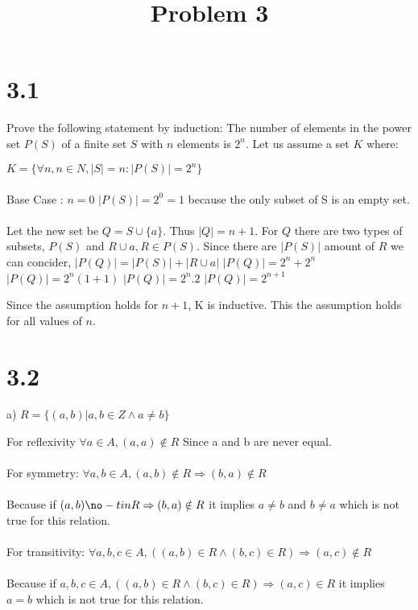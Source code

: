 \documentclass{article}
\begin{document}
    \title{\textbf{Problem 3}}
    \maketitle
    \section{\textbf{3.1}}
    Prove the following statement by induction:
    The number of elements in the power set $P(S)$ of a finite set $S$ with $n$ elements is $2^n$.
    Let us assume a set $K$ where:

    $K = \{ \forall n , n \in N, |S| = n : |P(S)| = 2^n \}$
    \\\\
    Base Case : $n = 0$
    $|P(S)| = 2^0 = 1$ because the only subset of S is an empty set.
    \\\\
    Let the new set be $Q = S \cup \{a\}$.
    Thus $|Q| = n + 1$.
    For $Q$ there are two types of subsets, $P(S)$ and $R \cup {a}, R\in P(S)$.
    Since there are $|P(S)|$ amount of $R$ we can concider,
    $|P(Q)| = |P(S)| + |R \cup {a}|$
    $|P(Q)| = 2^n + 2^n$
    $|P(Q)| = 2^n(1 + 1)$
    $|P(Q)| = 2^n . 2$
    $|P(Q)| = 2^{n+1}$

    Since the assumption holds for $n + 1$, K is inductive.
    This the assumption holds for all values of $n$.


    \section{\textbf{3.2}}
    
    a) $R = \{(a, b) | a, b \in Z \land a \neq b\}$

        For reflexivity
        $\forall a \in A, (a, a) \notin R$
        Since a and b are never equal.
        \\\\
        For symmetry:
        $\forall a, b \in A, (a, b) \notin R \Rightarrow (b, a) \notin R$
        \\\\
        Because if $(a, b) \no-tin R \Rightarrow (b, a) \notin R$ it implies $a \neq b$ and $b \neq a$ which is not true for this relation.
        \\\\
        For transitivity:
        $\forall a, b, c \in A, ((a, b) \in R \land (b, c) \in R) \Rightarrow (a, c) \notin R$
        \\\\
        Because if $a, b, c \in A, ((a, b) \in R \land (b, c) \in R) \Rightarrow (a, c) \in R$ it implies $a = b$ which is not true for this relation.
        \\\\
\end{document}
